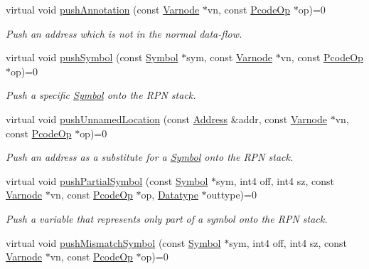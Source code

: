 \begin{DoxyCompactItemize}
virtual void \mbox{\hyperlink{class_print_language_a08b82dcc9073756390dbee98a85d9a95}{push\+Annotation}} (const \mbox{\hyperlink{class_varnode}{Varnode}} $\ast$vn, const \mbox{\hyperlink{class_pcode_op}{Pcode\+Op}} $\ast$op)=0
\begin{DoxyCompactList}\small\item\em Push an address which is not in the normal data-\/flow. \end{DoxyCompactList}\item 
virtual void \mbox{\hyperlink{class_print_language_a481c41c176f1b5edea4e984997243f43}{push\+Symbol}} (const \mbox{\hyperlink{class_symbol}{Symbol}} $\ast$sym, const \mbox{\hyperlink{class_varnode}{Varnode}} $\ast$vn, const \mbox{\hyperlink{class_pcode_op}{Pcode\+Op}} $\ast$op)=0
\begin{DoxyCompactList}\small\item\em Push a specific \mbox{\hyperlink{class_symbol}{Symbol}} onto the R\+PN stack. \end{DoxyCompactList}\item 
virtual void \mbox{\hyperlink{class_print_language_a16ffa214e32d7815a1350752a0113796}{push\+Unnamed\+Location}} (const \mbox{\hyperlink{class_address}{Address}} \&addr, const \mbox{\hyperlink{class_varnode}{Varnode}} $\ast$vn, const \mbox{\hyperlink{class_pcode_op}{Pcode\+Op}} $\ast$op)=0
\begin{DoxyCompactList}\small\item\em Push an address as a substitute for a \mbox{\hyperlink{class_symbol}{Symbol}} onto the R\+PN stack. \end{DoxyCompactList}\item 
virtual void \mbox{\hyperlink{class_print_language_a918310a27fdef5cde48b3fe6e4c7999f}{push\+Partial\+Symbol}} (const \mbox{\hyperlink{class_symbol}{Symbol}} $\ast$sym, int4 off, int4 sz, const \mbox{\hyperlink{class_varnode}{Varnode}} $\ast$vn, const \mbox{\hyperlink{class_pcode_op}{Pcode\+Op}} $\ast$op, \mbox{\hyperlink{class_datatype}{Datatype}} $\ast$outtype)=0
\begin{DoxyCompactList}\small\item\em Push a variable that represents only part of a symbol onto the R\+PN stack. \end{DoxyCompactList}\item 
virtual void \mbox{\hyperlink{class_print_language_a934e29f1d48b8b1c1a80218018f9e6a3}{push\+Mismatch\+Symbol}} (const \mbox{\hyperlink{class_symbol}{Symbol}} $\ast$sym, int4 off, int4 sz, const \mbox{\hyperlink{class_varnode}{Varnode}} $\ast$vn, const \mbox{\hyperlink{class_pcode_op}{Pcode\+Op}} $\ast$op)=0

\end{DoxyCompactItemize}
